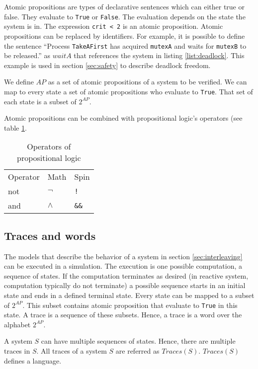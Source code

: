\documentclass[12pt,a4paper,twoside]{article}
\begin{document}
Atomic propositions are types of declarative sentences which can either true or false. They evaluate to \verb|True| or \verb|False|. The evaluation depends on the state the system is in. The expression \verb|crit < 2| is an atomic proposition. Atomic propositions can be replaced by identifiers. For example, it is possible to define the sentence ``Process \verb|TakeAFirst| has acquired \verb|mutexA| and waits for \verb|mutexB| to be released.'' as $waitA$  that references the system in listing \ref{list:deadlock}. This example is used in section \ref{sec:safety} to describe deadlock freedom.
 
We define $AP$ as a set of atomic propositions of a system to be verified. We can map to every state a set of atomic propositions who evaluate to \verb|True|. That set of each state is a subset of $2^{AP}$.

Atomic propositions can be combined with propositional logic's operators (see table \ref{tab:operators_of_propositionallogic}.

\begin{table}[ht]
  \centering

  \begin{tabular}{l l l}
    Operator & Math & Spin \\
    not & $\neg$ & \verb|!| \\
    and & $\land$ & \verb|&&| \\
  \end{tabular}
  \caption{Operators of propositional logic }
  \label{tab:operators_of_propositionallogic}
\end{table}

\subsection{Traces and words}
\label{sec:traces}

The models that describe the behavior of a system in section \ref{sec:interleaving} can be executed in a simulation. The execution is one possible computation, a sequence of states. If the computation terminates as desired (in reactive system, computation typically do not terminate) a possible sequence starts in an initial state and ends in a defined terminal state. Every state can be mapped to a subset of $2^{AP}$. This subset contains atomic proposition that evaluate to \verb|True| in this state. A trace is a sequence of these subsets. Hence, a trace is a word over the alphabet $2^{AP}$.

A system $S$ can have multiple sequences of states. Hence, there are multiple traces in $S$. All traces of a system $S$ are referred as $Traces(S)$. $Traces(S)$ defines a language.
\end{document}

